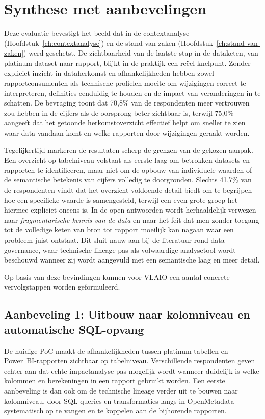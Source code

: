 \section{Synthese met aanbevelingen}

Deze evaluatie bevestigt het beeld dat in de contextanalyse (Hoofdstuk~\ref{ch:contextanalyse}) en de stand van zaken (Hoofdstuk~\ref{ch:stand-van-zaken}) werd geschetst. De zichtbaarheid van de laatste stap in de dataketen, van platinum-dataset naar rapport, blijkt in de praktijk een reëel knelpunt. Zonder expliciet inzicht in dataherkomst en afhankelijkheden hebben zowel rapportconsumenten als technische profielen moeite om wijzigingen correct te interpreteren, definities eenduidig te houden en de impact van veranderingen in te schatten. De bevraging toont dat 70{,}8\% van de respondenten meer vertrouwen zou hebben in de cijfers als de oorsprong beter zichtbaar is, terwijl 75{,}0\% aangeeft dat het getoonde herkomstoverzicht effectief helpt om sneller te zien waar data vandaan komt en welke rapporten door wijzigingen geraakt worden.

Tegelijkertijd markeren de resultaten scherp de grenzen van de gekozen aanpak. Een overzicht op tabelniveau volstaat als eerste laag om betrokken datasets en rapporten te identificeren, maar niet om de opbouw van individuele waarden of de semantische betekenis van cijfers volledig te doorgronden. Slechts 41{,}7\% van de respondenten vindt dat het overzicht voldoende detail biedt om te begrijpen hoe een specifieke waarde is samengesteld, terwijl een even grote groep het hiermee expliciet oneens is. In de open antwoorden wordt herhaaldelijk verwezen naar \emph{fragmentarische kennis van de data} en naar het feit dat men zonder toegang tot de volledige keten van bron tot rapport moeilijk kan nagaan waar een probleem juist ontstaat. Dit sluit nauw aan bij de literatuur rond data governance, waar technische lineage pas als volwaardige analysetool wordt beschouwd wanneer zij wordt aangevuld met een semantische laag en meer detail.

Op basis van deze bevindingen kunnen voor VLAIO een aantal concrete vervolgstappen worden geformuleerd.

\subsection*{Aanbeveling 1: Uitbouw naar kolomniveau en automatische SQL-opvang}

De huidige PoC maakt de afhankelijkheden tussen platinum-tabellen en Power~BI-rapporten zichtbaar op tabelniveau. Verschillende respondenten geven echter aan dat echte impactanalyse pas mogelijk wordt wanneer duidelijk is welke kolommen en berekeningen in een rapport gebruikt worden. Een eerste aanbeveling is dan ook om de technische lineage verder uit te bouwen naar kolomniveau, door SQL-queries en transformaties langs in OpenMetadata systematisch op te vangen en te koppelen aan de bijhorende rapporten.

